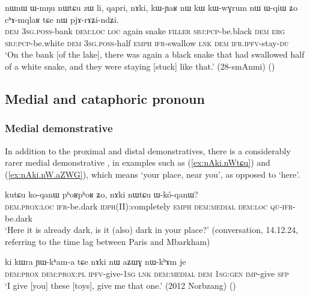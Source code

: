  \begin{exe}
\ex \label{ex:nW.pjArAZindZi}
\gll   nɯnɯ ɯ-mŋu nɯtɕu zɯ li, qapri, nɤki, kɯ-ɲaʁ nɯ kɯ kɯ-wɣrum nɯ ɯ-qiɯ ʑo cʰɤ-mqlaʁ tɕe nɯ pjɤ-rɤʑi-ndʑi. \\
\textsc{dem} \textsc{3sg}.\textsc{poss}-bank \textsc{dem}:\textsc{loc} \textsc{loc} again snake \textsc{filler} \textsc{sbj}:\textsc{pcp}-be.black \textsc{dem} \textsc{erg}  \textsc{sbj}:\textsc{pcp}-be.white \textsc{dem} \textsc{3sg}.\textsc{poss}-half \textsc{emph} \textsc{ifr}-swallow \textsc{lnk} \textsc{dem} \textsc{ifr}.\textsc{ipfv}-stay-\textsc{du} \\
\glt `On the bank [of the lake], there was again a black snake that had swallowed half of a white snake, and they were staying [stuck] like that.' (28-smAnmi) ()
\end{exe}


\subsection{Medial and cataphoric pronoun} 

\subsubsection{Medial demonstrative} \label{sec:medial.dem.pro}
In addition to the proximal and distal demonstratives,  there is a considerably rarer medial demonstrative , in examples such as (\ref{ex:nAki.nWtɕu}) and (\ref{ex:nAki.nW.aZWG}), which means `your place, near you', as opposed to `here'.

\begin{exe}
	\ex \label{ex:nAki.nWtɕu}
	\gll kutɕu ko-qanɯ pʰoʁpʰoʁ ʑo, nɤki nɯtɕu ɯ-kó-qanɯ? \\
	\textsc{dem}.\textsc{prox}:\textsc{loc} \textsc{ifr}-be.dark \textsc{idph}(II):completely \textsc{emph} \textsc{dem}:\textsc{medial} \textsc{dem}:\textsc{loc} \textsc{qu}-\textsc{ifr}-be.dark \\
	\glt `Here it is already dark, is it (also) dark in your place?' (conversation, 14.12.24, referring to the time lag between Paris and Mbarkham)
\end{exe}

\begin{exe}
	\ex \label{ex:nAki.nW.aZWG}
	\gll  ki kɯra ɲɯ-kʰam-a tɕe nɤki nɯ aʑɯɣ nɯ-kʰɤm je \\
	\textsc{dem}:\textsc{prox} \textsc{dem}:\textsc{prox}:\textsc{pl}  \textsc{ipfv}-give-\textsc{1sg} \textsc{lnk} \textsc{dem}:\textsc{medial} \textsc{dem} \textsc{1sg}:\textsc{gen} \textsc{imp}-give \textsc{sfp} \\
	\glt `I give [you] these [toys], give me that one.'  (2012 Norbzang)
()
\end{exe}

